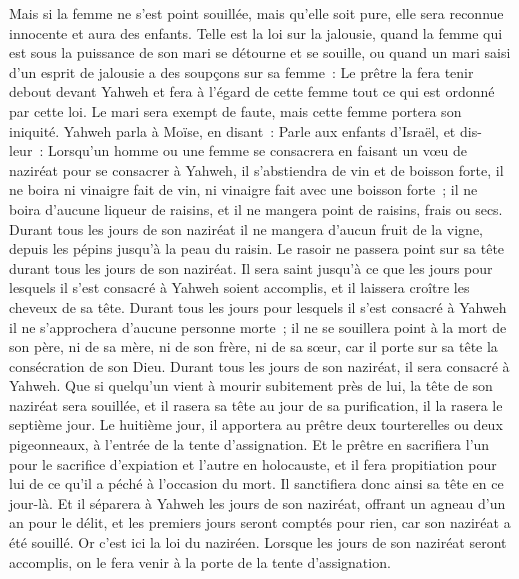 \begin{multicols}{2}
Mais si la femme ne s'est point souillée, mais qu'elle soit pure, elle sera reconnue innocente et aura des enfants.
Telle est la loi sur la jalousie, quand la femme qui est sous la puissance de son mari se détourne et se souille,
ou quand un mari saisi d'un esprit de jalousie a des soupçons sur sa femme~: Le prêtre la fera tenir debout devant Yahweh et fera à l'égard de cette femme tout ce qui est ordonné par cette loi.
Le mari sera exempt de faute, mais cette femme portera son iniquité.
\VerseOne{}Yahweh parla à Moïse, en disant~:
Parle aux enfants d'Israël, et dis-leur~: Lorsqu'un homme ou une femme se consacrera en faisant un vœu de naziréat pour se consacrer à Yahweh,
il s'abstiendra de vin et de boisson forte, il ne boira ni vinaigre fait de vin, ni vinaigre fait avec une boisson forte~; il ne boira d'aucune liqueur de raisins, et il ne mangera point de raisins, frais ou secs.
Durant tous les jours de son naziréat il ne mangera d'aucun fruit de la vigne, depuis les pépins jusqu'à la peau du raisin.
Le rasoir ne passera point sur sa tête durant tous les jours de son naziréat. Il sera saint jusqu'à ce que les jours pour lesquels il s'est consacré à Yahweh soient accomplis, et il laissera croître les cheveux de sa tête.
Durant tous les jours pour lesquels il s'est consacré à Yahweh il ne s'approchera d'aucune personne morte~;
il ne se souillera point à la mort de son père, ni de sa mère, ni de son frère, ni de sa sœur, car il porte sur sa tête la consécration de son Dieu.
Durant tous les jours de son naziréat, il sera consacré à Yahweh.
Que si quelqu'un vient à mourir subitement près de lui, la tête de son naziréat sera souillée, et il rasera sa tête au jour de sa purification, il la rasera le septième jour.
Le huitième jour, il apportera au prêtre deux tourterelles ou deux pigeonneaux, à l'entrée de la tente d'assignation.
Et le prêtre en sacrifiera l'un pour le sacrifice d'expiation et l'autre en holocauste, et il fera propitiation pour lui de ce qu'il a péché à l'occasion du mort. Il sanctifiera donc ainsi sa tête en ce jour-là.
Et il séparera à Yahweh les jours de son naziréat, offrant un agneau d'un an pour le délit, et les premiers jours seront comptés pour rien, car son naziréat a été souillé.
Or c'est ici la loi du naziréen. Lorsque les jours de son naziréat seront accomplis, on le fera venir à la porte de la tente d'assignation.

\end{multicols}

